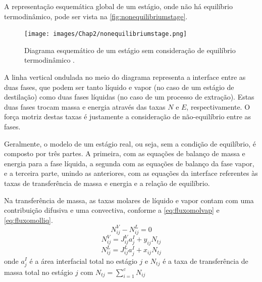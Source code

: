 A representação esquemática global de um estágio, onde não há equilíbrio termodinâmico, pode ser vista na
\autoref{fig:nonequilibriumstage}.
 \begin{figure}[htb]
 \centering \texttt{[image: images/Chap2/nonequilibriumstage.png]}
 \caption{Diagrama esquemático de um estágio sem consideração de equilíbrio termodinâmico \cite{Kooijman:1995a}.}
 \label{fig:nonequilibriumstage}
 \end{figure}
A linha vertical ondulada no meio do diagrama representa a interface entre as duas fases, que podem ser tanto líquido e
vapor (no caso de um estágio de destilação) como duas fases líquidas (no caso de
um processo de extração). Estas duas fases trocam massa e energia através das
taxas $N$ e $E$, respectivamente. O força motriz destas taxas é justamente a
consideração de não-equilíbrio entre as fases.

Geralmente, o modelo de um estágio real, ou seja, sem a condição de equilíbrio, é composto por três partes. A primeira,
com as equações de balanço de massa e energia para a fase líquida, a segunda com as equações de balanço da fase vapor,
e a terceira parte, unindo as anteriores, com as equações da interface referentes às taxas de transferência de massa
e energia e a relação de equilíbrio.

Na transferência de massa, as taxas molares de líquido e vapor contam com uma contribuição difusiva e uma convectiva,
conforme a \autoref{eq:fluxomolvap} e \ref{eq:fluxomolliq}. %
\begin{equation}
N^V_{ij} - N^L_{ij}= 0
\label{eq:equilfluxomol}
\end{equation}
\begin{equation}
N^V_{ij} = J^V_{ij}a_j^I + y_{ij}N_{tj}
\label{eq:fluxomolvap}
\end{equation}
\begin{equation}
N^L_{ij} = J^L_{ij}a_j^I + x_{ij}N_{tj}
\label{eq:fluxomolliq}
\end{equation}
onde $a^I_j$ é a área interfacial total no estágio $j$ e $N_{tj}$ é a taxa de
transferência de massa total no estágio $j$ com $N_{tj} =
\displaystyle\sum_{i=1}^c N_{ij}$

